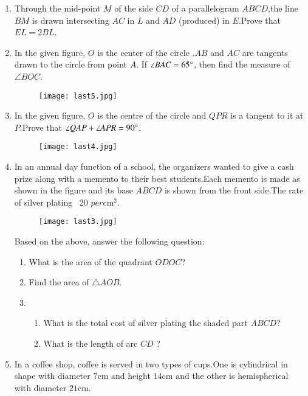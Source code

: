 \documentclass[12pt,-letter paper]{article}
\begin{document}
\begin{enumerate}
\item Through the mid-point $M$ of the side $CD$ of a parallelogram $ABCD$,the line $BM$ is drawn intersecting $AC$ in $L$ and $AD$ (produced) in $E$.Prove that $EL = 2BL$. 

\item In the given figure, $O$ is the center of the circle .$AB$ and $AC$ are tangents drawn to the circle from point $A$. If $\angle BAC = 65\degree $, then find the measure of $\angle BOC $.
	\begin{figure}[!ht]
		\centering
		\texttt{[image: last5.jpg]}
		\caption{}
		\label{fig:enter-label}
	\end{figure}

\item In the given figure, $O$ is the centre of the circle and $QPR$ is a tangent to it at $P$.Prove that $\angle QAP + \angle APR = 90\degree$.

	\begin{figure}[!ht]
		\centering
		\texttt{[image: last4.jpg]}
		\caption{}
		\label{fig:enter-label}
	\end{figure}
\newpage
\item In an annual day function of a school, the organizers wanted to give a cash prize along with a memento to their best students.Each memento is made as shown in the figure and its base $ABCD$ is shown from the front side.The rate of silver plating \rupee~20 $per  \mathrm{cm}^2$.

	\begin{figure}[!ht]
		\centering
		\texttt{[image: last3.jpg]}
		\caption{}
		\label{fig:enter-label}
	\end{figure}

	\text Based on the above, answer the following question:
		\begin{enumerate}
			\item What is the area of the quadrant $ODOC$?
			\item Find the area of $\triangle AOB$.
			\item
			\begin{enumerate}
				\item What is the total cost of silver plating the shaded part $ABCD$?
				\item What is the length of arc $CD$ ?
			\end{enumerate}
		\end{enumerate}
\newpage
\item In a coffee shop, coffee is served in two types of cups.One is cylindrical  in shape with diameter $7 \mathrm{cm}$ and height $14 \mathrm{cm} $ and the other is hemispherical with diameter $21 \mathrm{cm}$.


\end{enumerate}
\end{document}
